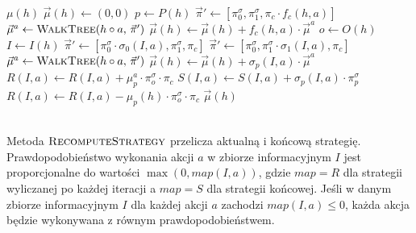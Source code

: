 \documentclass[magisterska]{pracamgr}
\begin{document}
\begin{algorithmic}
            \State \Return $\mu(h)$
        \EndIf
        \State $\vec{\mu}(h) \gets (0, 0)$ 
        \State $p \gets P(h)$
                \State $\vec{\pi}' \gets [\pi_0^{\sigma}, \pi_1^{\sigma}, \pi_c \cdot f_c(h, a)]$
                \State $\vec{\mu}^a \gets \Call{WalkTree}{h \circ a, \, \vec{\pi}'}$
                \State $\vec{\mu}(h) \gets \vec{\mu}(h) + f_c(h, a) \cdot \vec{\mu}^a$
            \EndFor
        \Else
            \State $o \gets O(h)$
            \State $I \gets I(h)$
                    \State $\vec{\pi}' \gets [\pi_0^{\sigma} \cdot \sigma_0(I, a), \pi_1^{\sigma}, \pi_c]$
                \Else
                    \State $\vec{\pi}' \gets [\pi_0^{\sigma}, \pi_1^{\sigma} \cdot \sigma_1(I, a), \pi_c]$
                \EndIf
                \State $\vec{\mu}^a \gets \Call{WalkTree}{h \circ a, \, \vec{\pi}'}$
                \State $\vec{\mu}(h) \gets \vec{\mu}(h) + \sigma_p(I, a) \cdot \vec{\mu}^a$
                \State $R(I, a) \gets R(I, a) + \mu_p^a \cdot \pi_{o}^{\sigma} \cdot \pi_c $
                \State $S(I, a) \gets S(I, a) + \sigma_p(I, a) \cdot \pi_{p}^{\sigma}$
            \EndFor
                \State $R(I, a) \gets R(I, a) - \mu_p(h) \cdot \pi_{o}^{\sigma} \cdot \pi_c $
            \EndFor
        \EndIf
    \State \Return $\vec{\mu}(h)$
    \EndFunction
\end{algorithmic}


$\,$ \\
Metoda $\Call{RecomputeStrategy}{}$ przelicza aktualną i końcową strategię. Prawdopodobieństwo wykonania akcji $a$
w zbiorze informacyjnym $I$ jest proporcjonalne do wartości $\max(0, map(I, a))$, gdzie $map=R$ dla strategii
wyliczanej po każdej iteracji a $map=S$ dla strategii końcowej. Jeśli w danym zbiorze informacyjnym $I$ dla każdej
akcji $a$ zachodzi $map(I, a) \leq 0$, każda akcja będzie wykonywana z równym prawdopodobieństwem. \\
\end{document}
